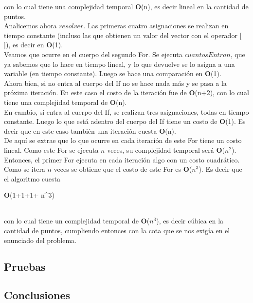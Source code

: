 con lo cual tiene una complejidad temporal \textbf{O}(n), es decir lineal en la cantidad de puntos.\\


\indent Analicemos ahora $resolver$. Las primeras cuatro asignaciones se realizan en tiempo constante (incluso las que obtienen un valor del vector con el operador [ ]), es decir en \textbf{O}(1).\\
\indent Veamos que ocurre en el cuerpo del segundo For. Se ejecuta $cuantosEntran$, que ya sabemos que lo hace en tiempo lineal, y lo que devuelve se lo asigna a una variable (en tiempo constante). Luego se hace una comparaci\'on en \textbf{O}(1).\\
\indent Ahora bien, si no entra al cuerpo del If no se hace nada más y se pasa a la pr\'oxima iteraci\'on. En este caso el costo de la iteración fue de \textbf{O}(n+2), con lo cual tiene una complejidad temporal de \textbf{O}(n).\\
\indent En cambio, si entra al cuerpo del If, se realizan tres asignaciones, todas en tiempo constante. Luego lo que está adentro del cuerpo del If tiene un costo de \textbf{O}(1). Es decir que en este caso también una iteraci\'on cuesta \textbf{O}(n).\\
\indent De aqu\'i se extrae que lo que ocurre en cada iteraci\'on de este For tiene un costo lineal. Como este For se ejecuta $n$ veces, su complejidad temporal será \textbf{O}($n^2$).\\
\indent Entonces, el primer For ejecuta en cada iteración algo con un costo cuadrático. Como se itera $n$ veces se obtiene que el costo de este For es \textbf{O}($n^3$). Es decir que el algoritmo cuesta \\
\begin{center}
\textbf{O}(1+1+1+ n^3)
\end{center}\\

con lo cual tiene un complejidad temporal de \textbf{O}($n^3$), es decir c\'ubica en la cantidad de puntos, cumpliendo entonces con la cota que se nos exigía en el enunciado del problema.\\


\subsection{Pruebas}

\subsection{Conclusiones}


